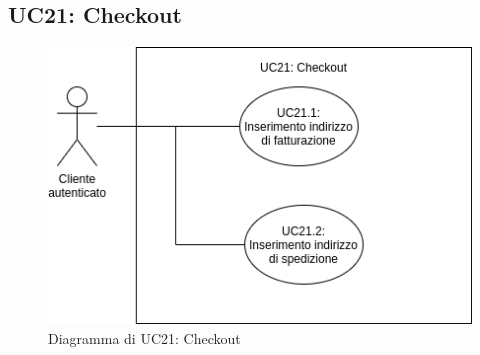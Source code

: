 
\subsection{UC21: Checkout}
\label{sec:UC21}
\begin{figure}[!ht]
    \caption{Diagramma di UC21: Checkout}
    \vspace{10px}
    \includegraphics[scale=0.5]{../../../Images/AnalisiRequisiti/UC21}
    \centering
\end{figure}
